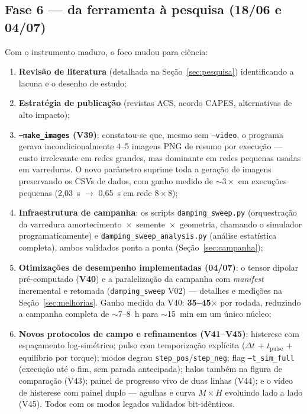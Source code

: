 \documentclass[11pt,a4paper]{article}
\newcommand{\code}[1]{\texttt{#1}}
\begin{document}
\subsection{Fase 6 --- da ferramenta à pesquisa (18/06 e 04/07)}

Com o instrumento maduro, o foco mudou para ciência:

\begin{enumerate}
\item \textbf{Revisão de literatura} (detalhada na
Seção~\ref{sec:pesquisa}) identificando a lacuna e o desenho de estudo;
\item \textbf{Estratégia de publicação} (revistas ACS, acordo CAPES,
alternativas de alto impacto);
\item \textbf{\code{--make\_images} (V39)}: constatou-se que, mesmo sem
\code{--video}, o programa gerava incondicionalmente 4--5 imagens PNG de
resumo por execução --- custo irrelevante em redes grandes, mas
dominante em redes pequenas usadas em varreduras. O novo parâmetro
suprime toda a geração de imagens preservando os CSVs de dados, com
ganho medido de $\sim 3\times$ em execuções pequenas (2{,}03~s $\to$
0{,}65~s em rede $8\times8$);
\item \textbf{Infraestrutura de campanha}: os scripts
\code{damping\_sweep.py} (orquestração da varredura
amortecimento~$\times$~semente~$\times$~geometria, chamando o simulador
programaticamente) e \code{damping\_sweep\_analysis.py} (análise
estatística completa), ambos validados ponta a ponta
(Seção~\ref{sec:campanha});
\item \textbf{Otimizações de desempenho implementadas (04/07)}: o tensor
dipolar pré-computado (\textbf{V40}) e a paralelização da campanha com
\emph{manifest} incremental e retomada (\code{damping\_sweep} V02) ---
detalhes e medições na Seção~\ref{sec:melhorias}. Ganho medido da V40:
\textbf{35--45$\times$} por rodada, reduzindo a campanha completa de
$\sim$7--8~h para $\sim$15~min em um único núcleo;
\item \textbf{Novos protocolos de campo e refinamentos (V41--V45)}:
histerese com espaçamento log-simétrico; pulso com temporização
explícita ($\Delta t$ + $t_{\mathrm{pulse}}$ + equilíbrio por torque);
modos degrau \code{step\_pos}/\code{step\_neg}; flag
\code{--t\_sim\_full} (execução até o fim, sem parada antecipada); halos
também na figura de comparação (V43); painel de progresso vivo de duas
linhas (V44); e o vídeo de histerese com painel duplo --- agulhas e
curva $M\times H$ evoluindo lado a lado (V45). Todos com os modos
legados validados bit-idênticos.
\end{enumerate}
\end{document}

